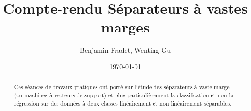 \documentclass{article}
\title{Compte-rendu Séparateurs à vastes marges}
\author{Benjamin Fradet, Wenting Gu}
\date{\today}
\begin{document}
\maketitle
\thispagestyle{fancy}


\begin{abstract}
    Ces séances de travaux pratiques ont porté sur l'étude des séparateurs à
    vaste marge (ou machines à vecteurs de support) et plus particulièrement la
    classification et non la régression sur des données à deux classes
    linéairement et non linéairement séparables.
\end{abstract}

\end{document}
